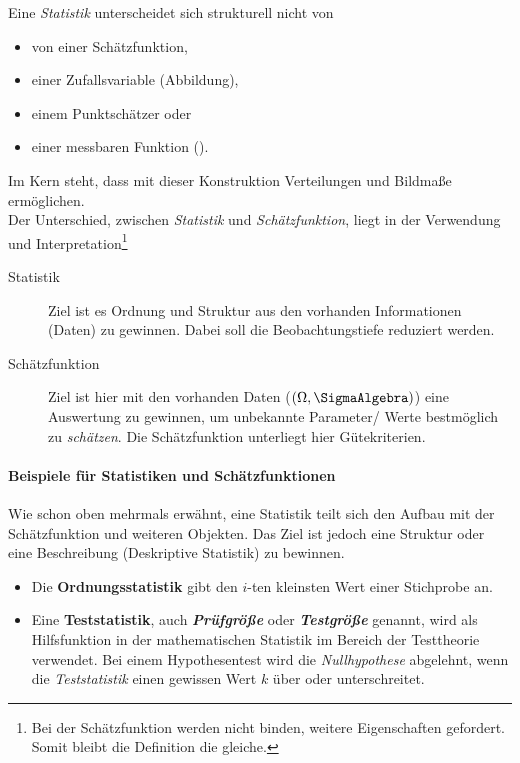 Eine \textit{Statistik} unterscheidet sich strukturell nicht von 
\begin{itemize}
	\item von einer Schätzfunktion,
	\item einer Zufallsvariable (Abbildung),
	\item einem Punktschätzer oder
	\item einer messbaren Funktion ().
\end{itemize}

Im Kern steht, dass mit dieser Konstruktion Verteilungen und Bildmaße ermöglichen.\\

Der Unterschied, zwischen \textit{Statistik} und \textit{Schätzfunktion}, liegt in der Verwendung und Interpretation\footnote{Bei der Schätzfunktion werden nicht binden, weitere Eigenschaften gefordert. Somit bleibt die Definition die gleiche.}

\begin{description}
	\item[Statistik] Ziel ist es Ordnung und Struktur aus den vorhanden Informationen (Daten) zu gewinnen. Dabei soll die Beobachtungstiefe reduziert werden. 
	\item[Schätzfunktion] Ziel ist hier mit den vorhanden Daten ($\left(\Omega, \SigmaAlgebra \right)$) eine Auswertung zu gewinnen, um unbekannte Parameter/ Werte bestmöglich zu \textit{schätzen}. Die Schätzfunktion unterliegt hier Gütekriterien.
\end{description}

\paragraph{Beispiele für Statistiken und Schätzfunktionen}
Wie schon oben mehrmals erwähnt, eine Statistik teilt sich den Aufbau mit der Schätzfunktion und weiteren Objekten. Das Ziel ist jedoch eine Struktur oder eine Beschreibung (Deskriptive Statistik) zu bewinnen.\\

\begin{itemize}
	\item Die \textbf{Ordnungsstatistik} gibt den $i$-ten kleinsten Wert einer Stichprobe an.\\
	\item Eine \textbf{Teststatistik}, auch \textit{\textbf{Prüfgröße}} oder \textit{\textbf{Testgröße}} genannt, wird als Hilfsfunktion in der mathematischen Statistik im Bereich der Testtheorie verwendet. Bei einem Hypothesentest wird die \textit{Nullhypothese} abgelehnt, wenn die \textit{Teststatistik} einen gewissen Wert $k$ über oder unterschreitet.
\end{itemize}


